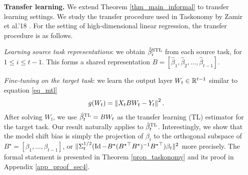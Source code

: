 \textbf{Transfer learning.}
We extend Theorem \ref{thm_main_informal} to transfer learning settings.
We study the transfer procedure used in Taskonomy by Zamir et al.'18 \cite{ZSSGM18}.
For the setting of high-dimensional linear regression, the transfer procedure is as follows.
\squishlist
	\item \textit{Learning source task representations}: we obtain $\hat{\beta}_i^{\text{STL}}$ from each source task, for $1\le i \le t-1$.
		This forms a shared representation ${B} = [\hat{\beta}_1,\hat{\beta}_2,\dots,\hat{\beta}_{t-1}]$.
	\item \textit{Fine-tuning on the target task}: we learn the output layer $W_t\in\mathbb{R}^{t-1}$ similar to equation \eqref{eq_mtl}
		\begin{align}
			g(W_t) = \left\| X_t B W_t - Y_t \right\|^2.
		\end{align}
\squishend
After solving $W_t$, we use $\hat{\beta}_t^{\text{TL}} = B W_t$ as the transfer learning (TL) estimator for the target task.
Our result naturally applies to $\hat{\beta}_t^{\text{TL}}$.
Interestingly, we show that the model shift bias is simply the projection of $\beta_t$ to the orthogonal subspace of $B^{\star} = [\beta_1,\dots,\beta_{t-1}]$, or $\|\Sigma_t^{1/2}(\operatorname{Id} - B^{\star}({B^{\star}}^{\top}B^{\star})^{-1}{B^{\star}}^{\top})\beta_t\|^2$ more precisely.
The formal statement is presented in Theorem \ref{prop_taskonomy} and its proof in Appendix \ref{app_proof_sec4}.
